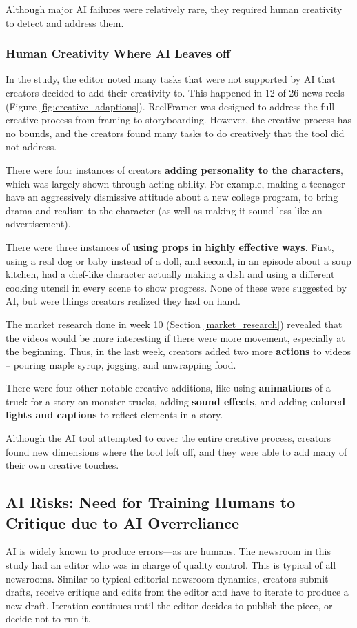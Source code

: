 Although major AI failures were relatively rare, they required human creativity to detect and address them.



\subsubsection{Human Creativity Where AI Leaves off} 

In the study, the editor noted many tasks that were not supported by AI that creators decided to add their creativity to. 
This happened in 12 of 26 news reels (Figure \ref{fig:creative_adaptions}).
ReelFramer was designed to address the full creative process from framing to storyboarding. 
However, the creative process has no bounds, and the creators found many tasks to do creatively that the tool did not address.

There were four instances of creators \textbf{adding personality to the characters}, which was largely shown through acting ability. 
For example, making a teenager have an aggressively dismissive attitude about a new college program, to bring drama and realism to the character (as well as making it sound less like an advertisement).

There were three instances of \textbf{using props in highly effective ways}.
First, using a real dog or baby instead of a doll, and second, in an episode about a soup kitchen, had a chef-like character actually making a dish and using a different cooking utensil in every scene to show progress. 
None of these were suggested by AI, but were things creators realized they had on hand.

The market research done in week 10 (Section \ref{market_research}) revealed that the videos would be more interesting if there were more movement, especially at the beginning. 
Thus, in the last week, creators added two more \textbf{actions} to videos -- pouring maple syrup, jogging, and unwrapping food.

There were four other notable creative additions, like using \textbf{animations} of a truck for a story on monster trucks, adding \textbf{sound effects}, and adding \textbf{colored lights and captions} to reflect elements in a story.

Although the AI tool attempted to cover the entire creative process, creators found new dimensions where the tool left off, and they were able to add many of their own creative touches.


\subsection{AI Risks: Need for Training Humans to Critique due to AI Overreliance}
AI is widely known to produce errors---as are humans. 
The newsroom in this study had an editor who was in charge of quality control. 
This is typical of all newsrooms. 
Similar to typical editorial newsroom dynamics, creators submit drafts, receive critique and edits from the editor and have to iterate to produce a new draft. 
Iteration continues until the editor decides to publish the piece, or decide not to run it. 

